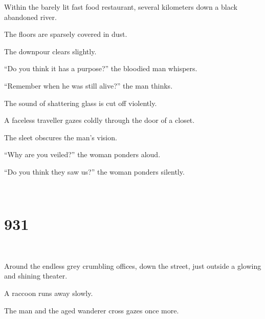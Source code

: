 \documentclass{report}
\begin{document}
Within the barely lit fast food restaurant, several kilometers down a black abandoned river.

The floors are sparsely covered in dust.

The downpour clears slightly.

``Do you think it has a purpose?'' the bloodied man whispers.

``Remember when he was still alive?'' the man thinks.

The sound of shattering glass is cut off violently.

A faceless traveller gazes coldly through the door of a closet.

The sleet obscures the man's vision.

``Why are you veiled?'' the woman ponders aloud.

``Do you think they saw us?'' the woman ponders silently.

~
\chapter*{931}
~

Around the endless grey crumbling offices, down the street, just outside a glowing and shining theater.

A raccoon runs away slowly.

The man and the aged wanderer cross gazes once more.

~
\end{document}
